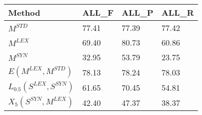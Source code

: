 \begin{table}[]
\centering
\begin{tabular}{@{}llll@{}}
\toprule
\textbf{Method} & \textbf{ALL\_F} & \textbf{ALL\_P} & \textbf{ALL\_R}\\ \midrule
$M^{STD}$                    & 77.41 & 77.39 & 77.42  \\ 
$M^{LEX}$                    & 69.40 & 80.73 & 60.86 \\
$M^{SYN}$                    & 32.95 & 53.79 & 23.75 \\ 
\midrule
$E(M^{LEX}, M^{STD})$        & 78.13 & 78.24 & 78.03 \\
\midrule
$L_{0.5}(S^{LEX}, S^{SYN})$  & 61.65 & 70.45 & 54.81 \\
\midrule
%
$X_5(S^{SYN}, M^{LEX})$ &  42.40          & 47.37            & 38.37          \\ 

\end{tabular}
\end{table}
